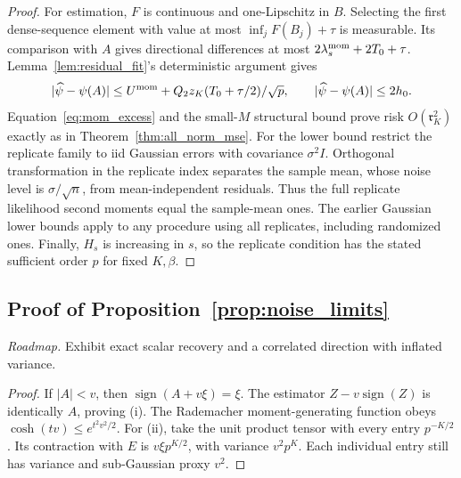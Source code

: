 \begin{proof}
For estimation, $F$ is continuous and one-Lipschitz in $B$. Selecting the first dense-sequence element with value at most $\inf_jF(B_j)+\tau$ is measurable. Its comparison with $A$ gives directional differences at most $2\lambda_s^{\rm mom}+2T_0+\tau$. Lemma~\ref{lem:residual_fit}'s deterministic argument gives
\[
 |\widehat\psi-\psi(A)|\le U^{\rm mom}
       +Q_2z_K(T_0+\tau/2)/\sqrt p,
 \qquad |\widehat\psi-\psi(A)|\le2h_0.
\]
Equation~\eqref{eq:mom_excess} and the small-$M$ structural bound prove risk $O(\mathfrak r_K^2)$ exactly as in Theorem~\ref{thm:all_norm_mse}. For the lower bound restrict the replicate family to iid Gaussian errors with covariance $\sigma^2I$. Orthogonal transformation in the replicate index separates the sample mean, whose noise level is $\sigma/\sqrt n$, from mean-independent residuals. Thus the full replicate likelihood second moments equal the sample-mean ones. The earlier Gaussian lower bounds apply to any procedure using all replicates, including randomized ones. Finally, $H_s$ is increasing in $s$, so the replicate condition has the stated sufficient order $p$ for fixed $K,\beta$.
\end{proof}

\subsection{Proof of Proposition~\ref{prop:noise_limits}}
\noindent\emph{Roadmap.} Exhibit exact scalar recovery and a correlated direction with inflated variance.
\begin{proof}
If $|A|<v$, then $\operatorname{sign}(A+v\xi)=\xi$. The estimator
$Z-v\operatorname{sign}(Z)$ is identically $A$, proving (i). The Rademacher moment-generating function obeys $\cosh(tv)\le e^{t^2v^2/2}$.
For (ii), take the unit product tensor with every entry $p^{-K/2}$. Its contraction with $E$ is $v\xi p^{K/2}$, with variance $v^2p^K$. Each individual entry still has variance and sub-Gaussian proxy $v^2$.
\end{proof}

